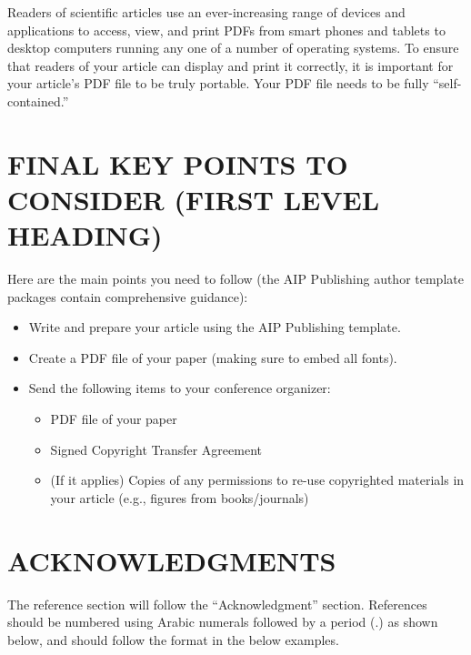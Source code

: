 \documentclass{aip-cp}
\begin{document}
Readers of scientific articles use an ever-increasing range of devices and applications to access, view, and print PDFs  from smart phones and tablets to desktop computers running any one of a number of operating systems. To ensure that readers of  your article can display and print it correctly, it is important for your article's PDF file to be truly portable. Your PDF file needs to be fully ``self-contained.''%

\section{FINAL KEY POINTS TO CONSIDER (FIRST LEVEL HEADING)}
Here are the main points you need to follow (the AIP Publishing author template packages contain comprehensive guidance):

\begin{itemize}
\item Write and prepare your article using the AIP Publishing template.
\item Create a PDF file of your paper (making sure to embed all fonts).
\item Send the following items to your conference organizer:
\begin{itemize}
\item PDF file of your paper
\item Signed Copyright Transfer Agreement
\item (If it applies) Copies of any permissions to re-use copyrighted materials in your article (e.g., figures from books/journals)
\end{itemize}
\end{itemize}




\section{ACKNOWLEDGMENTS}
The reference section will follow the ``Acknowledgment'' section.  References should be numbered using Arabic numerals followed by a period (.) as shown below, and should follow the format in the below examples.


\nocite{*}
%
%
\end{document}

